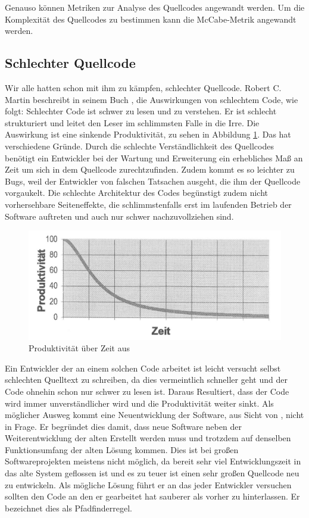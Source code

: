 Genauso können Metriken zur Analyse des Quellcodes angewandt werden. Um die Komplexität des Quellcodes zu bestimmen kann die McCabe-Metrik\cite{McCabe} angewandt werden.

\subsection{Schlechter Quellcode}

Wir alle hatten schon mit ihm zu kämpfen, schlechter Quellcode. Robert C. Martin beschreibt in seinem Buch \cite[S. 27f.]{Martin}, die Auswirkungen von schlechtem Code, wie folgt: Schlechter Code ist schwer zu lesen und zu verstehen. Er ist schlecht strukturiert und leitet den Leser im schlimmsten Falle in die Irre.
Die Auswirkung ist eine sinkende Produktivität, zu sehen in Abbildung \ref{grundlagen:produktivitaet}.
Das hat verschiedene Gründe. Durch die schlechte Verständlichkeit des Quellcodes benötigt ein Entwickler bei der Wartung und Erweiterung ein erhebliches Maß an Zeit um sich in dem Quellcode zurechtzufinden. Zudem kommt es so leichter zu Bugs, weil der Entwickler von falschen Tatsachen ausgeht, die ihm der Quellcode vorgaukelt. Die schlechte Architektur des Codes begünstigt zudem nicht vorhersehbare Seiteneffekte, die schlimmstenfalls erst im laufenden Betrieb der Software auftreten und auch nur schwer nachzuvollziehen sind.

\begin{figure}[H]
	\centering
	\includegraphics[width=\textwidth]{poduktivitaet.jpg}
	\caption{Produktivität über Zeit aus \cite[S. 29]{Martin}}
	\label{grundlagen:produktivitaet}
\end{figure}

Ein Entwickler der an einem solchen Code arbeitet ist leicht versucht selbst schlechten Quelltext zu schreiben, da dies vermeintlich schneller geht und der Code ohnehin schon nur schwer zu lesen ist. Daraus Resultiert, dass der Code wird immer unverständlicher wird und die Produktivität weiter sinkt.
Als möglicher Ausweg kommt eine Neuentwicklung der Software, aus Sicht von \cite[S. 29f.]{Martin}, nicht in Frage.
Er begründet dies damit, dass neue Software neben der Weiterentwicklung der alten Erstellt werden muss und trotzdem auf denselben Funktionsumfang der alten Lösung kommen. Dies ist bei großen Softwareprojekten meistens nicht möglich, da bereit sehr viel Entwicklungszeit in das alte System geflossen ist und es zu teuer ist einen sehr großen Quellcode neu zu entwickeln. Als mögliche Lösung führt er an das jeder Entwickler versuchen sollten den Code an den er gearbeitet hat sauberer als vorher zu hinterlassen. Er bezeichnet dies als Pfadfinderregel.

